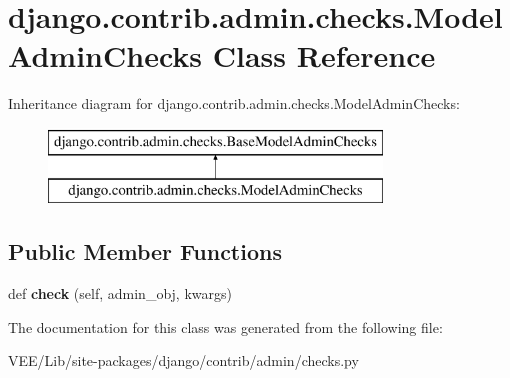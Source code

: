 \hypertarget{classdjango_1_1contrib_1_1admin_1_1checks_1_1_model_admin_checks}{}\section{django.\+contrib.\+admin.\+checks.\+Model\+Admin\+Checks Class Reference}
\label{classdjango_1_1contrib_1_1admin_1_1checks_1_1_model_admin_checks}
Inheritance diagram for django.\+contrib.\+admin.\+checks.\+Model\+Admin\+Checks\+:\begin{figure}[H]
\begin{center}
\leavevmode
\includegraphics[height=2.000000cm]{classdjango_1_1contrib_1_1admin_1_1checks_1_1_model_admin_checks}
\end{center}
\end{figure}
\subsection*{Public Member Functions}
\begin{DoxyCompactItemize}
\item 
\mbox{\label{classdjango_1_1contrib_1_1admin_1_1checks_1_1_model_admin_checks_acdd52eb331a5ed742797da1699ef22f3}} 
def {\bfseries check} (self, admin\+\_\+obj, kwargs)
\end{DoxyCompactItemize}


The documentation for this class was generated from the following file\+:\begin{DoxyCompactItemize}
\item 
V\+E\+E/\+Lib/site-\/packages/django/contrib/admin/checks.\+py\end{DoxyCompactItemize}
